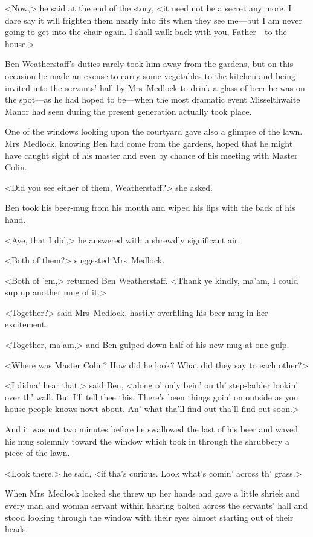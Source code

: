 <Now,> he said at the end of the story, <it need not be a secret any more. I dare say it will frighten them nearly into fits when they see me—but I am never going to get into the chair again. I shall walk back with you, Father—to the house.>

Ben Weatherstaff's duties rarely took him away from the gardens, but on this occasion he made an excuse to carry some vegetables to the kitchen and being invited into the servants' hall by Mrs~Medlock to drink a glass of beer he was on the spot—as he had hoped to be—when the most dramatic event Misselthwaite Manor had seen during the present generation actually took place.

One of the windows looking upon the courtyard gave also a glimpse of the lawn. Mrs~Medlock, knowing Ben had come from the gardens, hoped that he might have caught sight of his master and even by chance of his meeting with Master Colin.

<Did you see either of them, Weatherstaff?> she asked.

Ben took his beer-mug from his mouth and wiped his lips with the back of his hand.

<Aye, that I did,> he answered with a shrewdly significant air.

<Both of them?> suggested Mrs~Medlock.

<Both of 'em,> returned Ben Weatherstaff. <Thank ye kindly, ma'am, I could sup up another mug of it.>

<Together?> said Mrs~Medlock, hastily overfilling his beer-mug in her excitement.

<Together, ma'am,> and Ben gulped down half of his new mug at one gulp.

<Where was Master Colin? How did he look? What did they say to each other?>

<I didna' hear that,> said Ben, <along o' only bein' on th' step-ladder lookin' over th' wall. But I'll tell thee this. There's been things goin' on outside as you house people knows nowt about. An' what tha'll find out tha'll find out soon.>

And it was not two minutes before he swallowed the last of his beer and waved his mug solemnly toward the window which took in through the shrubbery a piece of the lawn.

<Look there,> he said, <if tha's curious. Look what's comin' across th' grass.>

When Mrs~Medlock looked she threw up her hands and gave a little shriek and every man and woman servant within hearing bolted across the servants' hall and stood looking through the window with their eyes almost starting out of their heads.


